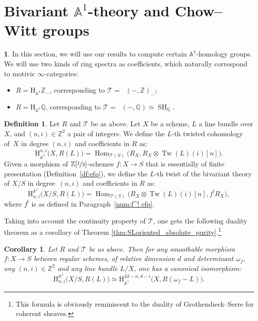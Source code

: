 \documentclass[11pt]{article}
\numberwithin{equation}{section}\renewcommand{\encodingdefault}{TU}
\newcommand{\T}{\mathscr T}
\renewcommand{\AA}{\mathbb A}
\newcommand{\HA}{\mathrm H_{\AA^1}}
\newcommand{\BA}{\mathrm H^{\AA^1}}
\DeclareMathOperator{\SH}{SH}
\DeclareMathOperator{\DA}{D_{\AA^1}}
\DeclareMathOperator{\Hom}{Hom}
\DeclareMathOperator{\Tw}{Tw}
\newcommand{\ZZ} {\mathbb Z}
\newcommand{\ZZot} {\mathbb Z[\nicefrac 1 2]}
\newcommand{\QQ} {\mathbb Q}
\newtheorem{cor}[thm]{Corollary}
\theoremstyle{remark}
\theoremstyle{definition}
\newtheorem{df}[thm]{Definition}
\newtheorem{num}[thm]{}
\numberwithin{equation}{thm}
\begin{document}
\section{Bivariant \texorpdfstring{$\AA^1$}{A1}-theory and Chow--Witt groups}
\label{sec:bivariant}

\begin{num}
In this section, we will use our results to compute certain $\AA^1$-homology groups.
We will use two kinds of ring spectra as coefficients,
which naturally correspond to motivic $\infty$-categories:
\begin{itemize}
\item $R=\HA \ZZ_-$, corresponding to $\T=\DA(-,\ZZ)_-$;
\item $R=\HA \QQ$, corresponding to $\T=\DA(-,\QQ) \simeq \SH_\QQ$.
\end{itemize}
\end{num}
\begin{df}\label{df:bivariant_A1}
Let $R$ and $\T$ be as above.
Let $X$ be a scheme, $L$ a line bundle over $X$, and $(n,i) \in\ZZ^2$
a pair of integers.
We define the $L$-th twisted cohomology of~$X$ in degree $(n,i)$ and coefficients in $R$ as:
\[
\HA^{n,i}\big(X,R(L)\big)=\Hom_{\T(S)}\big(R_X,R_X\otimes \Tw(L)(i)[n]\big).
\]
Given a morphism
of $\ZZot$-schemes $f:X \to S$ that is essentially of finite presentation (Definition~\ref{df:efp}),
we define the $L$-th twist of the bivariant theory of $X/S$ in degree~$(n,i)$ and coefficients in $R$
as:
\[
\BA_{n,i}\big(X/S,R(L)\big)=\Hom_{\T(S)}\big(R_X\otimes \Tw(L)(i)[n],f^!R_X\big),
\]
where $f^!$ is as defined in Paragraph~\ref{num:f^! efp}.
\end{df}

Taking into account the continuity property of $\T$,
one gets the following duality theorem as a corollary of Theorem
\ref{thm:SLoriented_absolute_purity}.\footnote{This formula is obviously reminiscent
to the duality of Grothendieck--Serre for coherent sheaves.}
\begin{cor}\label{cor:BM=coh}
Let $R$ and $\T$ be as above.
Then for any smoothable morphism $f:X \to S$
between regular schemes,
of relative dimension $d$ and determinant $\omega_f$,
any $(n,i) \in \ZZ^2$ and any line bundle $L/X$, one has a canonical isomorphism:
\[
\BA_{n,i}\big(X/S,R(L)\big) \simeq \HA^{2d-n,d-i}\big(X,R(\omega_f-L)\big).
\]
\end{cor}
\end{document}
